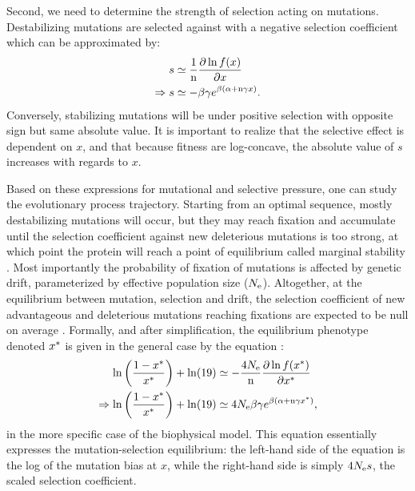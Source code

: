 \documentclass{MBE}%
\begin{document}
Second, we need to determine the strength of selection acting on mutations.
Destabilizing mutations are selected against with a negative selection coefficient which can be approximated by:
\begin{align}
 s & \simeq \frac{1}{\Nsite}\frac{ \partial \ln f(x) }{\partial x} \label{eq:s} \\
 \Rightarrow s & \simeq - \beta \gamma e^{\beta (\DeltaGmin + \Nsite \gamma x)}. \label{eq:s-unfolded}
\end{align}
Conversely, stabilizing mutations will be under positive selection with opposite sign but same absolute value.
It is important to realize that the selective effect is dependent on $x$, and that because fitness are log-concave, the absolute value of $s$ increases with regards to $x$.

Based on these expressions for mutational and selective pressure, one can study the evolutionary process trajectory.
Starting from an optimal sequence, mostly destabilizing mutations will occur, but they may reach fixation and accumulate until the selection coefficient against new deleterious mutations is too strong, at which point the protein will reach a point of equilibrium called marginal stability \citep{Taverna2002, Bloom2007}.
Most importantly the probability of fixation of mutations is affected by genetic drift, parameterized by effective population size ($N_{\mathrm{e}}$).
Altogether, at the equilibrium between mutation, selection and drift, the selection coefficient of new advantageous and deleterious mutations reaching fixations are expected to be null on average \citep{Goldstein2013}.
Formally, and after simplification, the equilibrium phenotype denoted $x^{*}$ is given in the general case by the equation :
\begin{align}
 \ln \left( \frac{1 - x\eq}{x\eq} \right) + \ln (19) & \simeq - \frac{4\Ne}{\Nsite} \frac{ \partial \ln f(x\eq) }{\partial {x\eq}} \\
 \Rightarrow \ln \left( \frac{1 - x\eq}{x\eq} \right) + \ln (19) & \simeq 4\Ne \beta \gamma e^{\beta (\DeltaGmin + \Nsite \gamma x\eq)} \text{,} \label{eq:equilibrium}
\end{align}
in the more specific case of the biophysical model. This equation essentially expresses the mutation-selection equilibrium: the left-hand side of the equation is the log of the mutation bias at $x$, while the right-hand side is simply $4 N_{\mathrm{e}} s$, the scaled selection coefficient.
\end{document}
